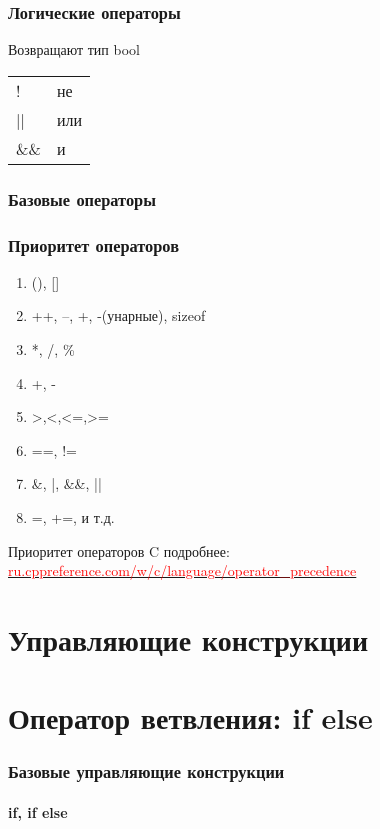 \documentclass[12pt,pdf,hyperref={unicode}]{beamer}
\begin{document}
\begin{frame}
\frametitle{Логические операторы}
Возвращают тип bool
\begin{center}
\begin{tabular}{ l | l}
  ! & не \\
  || & или \\
  \&\& & и \\
\end{tabular}
\end{center}
\end{frame}


\begin{frame}
\frametitle{Базовые операторы}
\frametitle{Приоритет операторов}
\begin{center}
\begin{enumerate}
\item (), []
\item ++, --, +, -(унарные), sizeof
\item *, /, \%
\item +, -
\item >,<,<=,>=
\item ==, !=
\item \&, |, \&\&, ||
\item =, +=, и т.д.
\end{enumerate}
\end{center}
Приоритет операторов C подробнее:\\
\href{http://ru.cppreference.com/w/c/language/operator_precedence}
{\textcolor{red}{ru.cppreference.com/w/c/language/operator\_precedence}}
\end{frame}







\section{Управляющие конструкции}

\section{Оператор ветвления: if else}

\begin{frame}[fragile]
\frametitle{Базовые управляющие конструкции} 
\framesubtitle{if, if else}







\end{frame}
\end{document}

